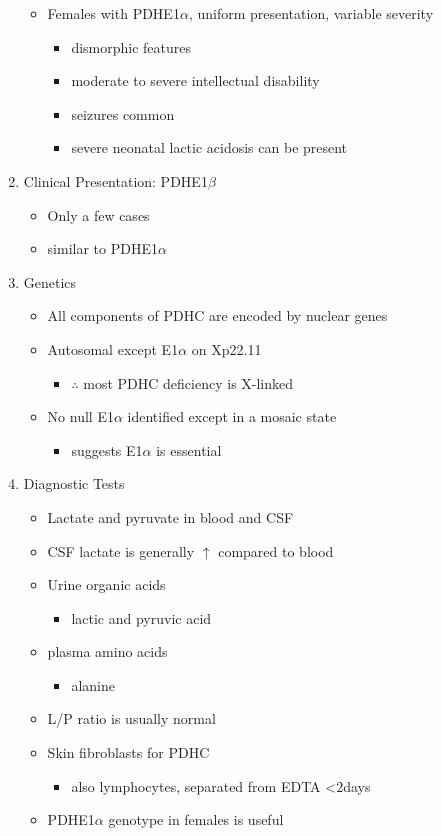 \documentclass{scrartcl}
\begin{document}
\begin{enumerate}
\begin{itemize}
\item Females with PDHE1\(\alpha\), uniform presentation, variable severity
\begin{itemize}
\item dismorphic features
\item moderate to severe intellectual disability
\item seizures common
\item severe neonatal lactic acidosis can be present
\end{itemize}
\end{itemize}

\item Clinical Presentation: PDHE1\(\beta\)
\label{sec:org598af2e}
\begin{itemize}
\item Only a few cases
\item similar to PDHE1\(\alpha\)
\end{itemize}

\item Genetics
\label{sec:org2643c7d}
\begin{itemize}
\item All components of PDHC are encoded by nuclear genes
\item Autosomal except E1\(\alpha\) on Xp22.11
\begin{itemize}
\item \(\therefore\) most PDHC deficiency is X-linked
\end{itemize}
\item No null E1\(\alpha\) identified except in a mosaic state
\begin{itemize}
\item suggests E1\(\alpha\) is essential
\end{itemize}
\end{itemize}

\item Diagnostic Tests
\label{sec:orge198baf}
\begin{itemize}
\item Lactate and pyruvate in blood and CSF
\item CSF lactate is generally \(\uparrow\) compared to blood
\item Urine organic acids
\begin{itemize}
\item lactic and pyruvic acid
\end{itemize}
\item plasma amino acids
\begin{itemize}
\item alanine
\end{itemize}
\item L/P ratio is usually normal
\item Skin fibroblasts for PDHC
\begin{itemize}
\item also lymphocytes, separated from EDTA <2days
\end{itemize}
\item PDHE1\(\alpha\) genotype in females is useful
\end{itemize}


\end{enumerate}
\end{document}

